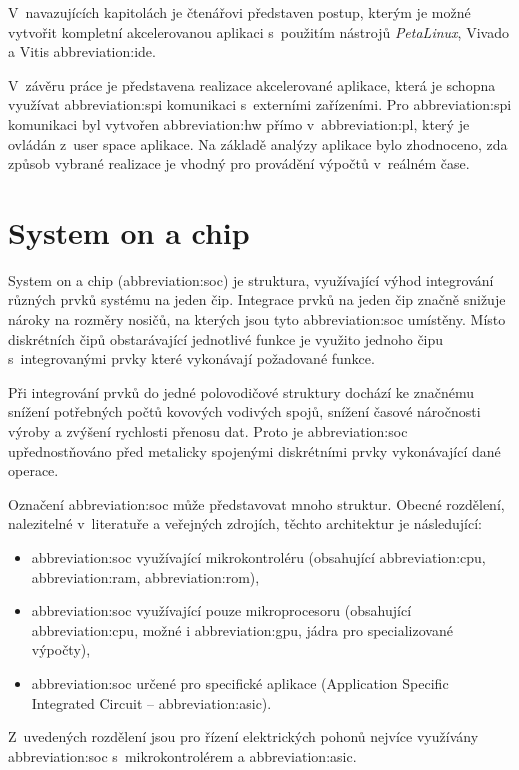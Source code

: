 \documentclass[a4paper, twoside, 11pt]{article}
\begin{document}
V~navazujících kapitolách je čtenářovi představen postup, kterým je možné vytvořit kompletní akcelerovanou aplikaci s~použitím nástrojů \textit{PetaLinux}, Vivado a Vitis \gls{abbreviation:ide}.\par
V~závěru práce je představena realizace akcelerované aplikace, která je schopna využívat \gls{abbreviation:spi} komunikaci s~externími zařízeními. Pro \gls{abbreviation:spi} komunikaci byl vytvořen \gls{abbreviation:hw} přímo v~\gls{abbreviation:pl}, který je ovládán z~user space aplikace. Na základě analýzy aplikace bylo zhodnoceno, zda způsob vybrané realizace je vhodný pro provádění výpočtů v~reálném čase.

\flushbottom %
\newpage

\section{System on a chip}\label{sec:system-on-a-chip}
	System on a chip (\gls{abbreviation:soc}) je struktura, využívající výhod integrování různých prvků systému na jeden čip. Integrace prvků na jeden čip značně snižuje nároky na rozměry nosičů, na kterých jsou tyto \gls{abbreviation:soc} umístěny. Místo diskrétních čipů obstarávající jednotlivé funkce je využito jednoho čipu s~integrovanými prvky které vykonávají požadované funkce.\par
	Při integrování prvků do jedné polovodičové struktury dochází ke značnému snížení potřebných počtů kovových vodivých spojů, snížení časové náročnosti výroby a zvýšení rychlosti přenosu dat. Proto je \gls{abbreviation:soc} upřednostňováno před metalicky spojenými diskrétními prvky vykonávající dané operace.\par
	Označení \gls{abbreviation:soc} může představovat mnoho struktur. Obecné rozdělení, nalezitelné v~literatuře a veřejných zdrojích, těchto architektur je následující:
	\begin{itemize}
		\item \gls{abbreviation:soc} využívající mikrokontroléru (obsahující \gls{abbreviation:cpu}, \gls{abbreviation:ram}, \gls{abbreviation:rom}),
		\item \gls{abbreviation:soc} využívající pouze mikroprocesoru (obsahující \gls{abbreviation:cpu}, možné i \gls{abbreviation:gpu}, jádra pro specializované výpočty),
		\item \gls{abbreviation:soc} určené pro specifické aplikace (Application Specific Integrated Circuit – \gls{abbreviation:asic}).
	\end{itemize}\cite{tomshardware-system-on-chip}\par
	Z~uvedených rozdělení jsou pro řízení elektrických pohonů nejvíce využívány \gls{abbreviation:soc} s~mikrokontrolérem a \gls{abbreviation:asic}.
\end{document}
